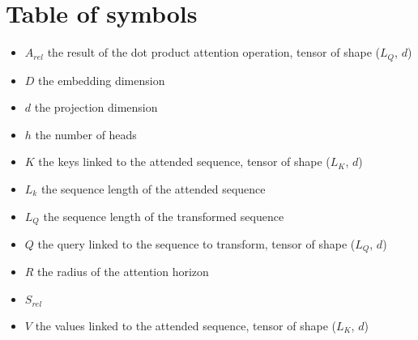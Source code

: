 \section*{Table of symbols}

\begin{itemize}
	\item $A_{rel}$ the result of the dot product attention operation, tensor of shape ($L_Q$, $d$)
	\item $D$ the embedding dimension
	\item $d$ the projection dimension
	\item $h$ the number of heads
	\item $K$ the keys linked to the attended sequence, tensor of shape ($L_K$, $d$)
	\item $L_k$ the sequence length of the attended sequence
	\item $L_Q$ the sequence length of the transformed sequence
	\item $Q$  the query linked to the sequence to transform, tensor of shape ($L_Q$, $d$)
	\item $R$ the radius of the attention horizon
	\item $S_{rel}$
	\item $V$ the values linked to the attended sequence, tensor of shape ($L_K$, $d$)
\end{itemize}

\endinput